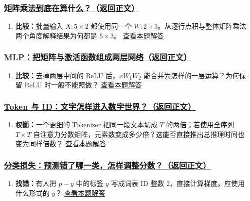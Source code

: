 \subsubsection*{\hyperref[check:03-matrix-multiplication]{矩阵乘法到底在算什么？（返回正文）}}\begin{enumerate}[label={},leftmargin=4.8em,itemsep=4pt]
\item[\textbf{C4-12.}] \label{exercise:C4-12}\label{extension:03-matrix-multiplication:4}\textbf{比较：}批量输入 $X:5\times2$ 都使用同一个 $W:2\times3$。从逐行点积与整体矩阵乘法两个角度解释结果为何都是 $5\times3$。 \hyperref[answerpiece:03-matrix-multiplication:4]{查看本题解答}
\end{enumerate}

\subsubsection*{\hyperref[check:10-mlp]{MLP：把矩阵与激活函数组成两层网络（返回正文）}}\begin{enumerate}[label={},leftmargin=4.8em,itemsep=4pt]
\item[\textbf{C4-13.}] \label{exercise:C4-13}\label{extension:10-mlp:4}\textbf{比较：}去掉两层中间的 ReLU 后，$xW_1W_2$ 能合并为怎样的一层运算？为何保留 ReLU 时一般不能照做？ \hyperref[answerpiece:10-mlp:4]{查看本题解答}
\end{enumerate}

\subsubsection*{\hyperref[check:20a-tokenizer]{Token 与 ID：文字怎样进入数字世界？（返回正文）}}\begin{enumerate}[label={},leftmargin=4.8em,itemsep=4pt]
\item[\textbf{C4-14.}] \label{exercise:C4-14}\label{extension:20a-tokenizer:4}\textbf{权衡：}一个更细的 Tokenizer 把同一段文本切成 $T$ 的两倍；若使用全序列 $T\times T$ 自注意力分数矩阵，元素数变成多少倍？这能否直接推出总推理时间也变为同样倍数？ \hyperref[answerpiece:20a-tokenizer:4]{查看本题解答}
\end{enumerate}

\subsubsection*{\hyperref[check:20c-classification-loss]{分类损失：预测错了哪一类，怎样调整分数？（返回正文）}}\begin{enumerate}[label={},leftmargin=4.8em,itemsep=4pt]
\item[\textbf{C4-15.}] \label{exercise:C4-15}\label{extension:20c-classification-loss:4}\textbf{找错：}有人把 $p-y$ 中的标签 $y$ 写成词表 ID 整数 $2$，直接计算梯度。应使用什么形式的 $y$？ \hyperref[answerpiece:20c-classification-loss:4]{查看本题解答}
\end{enumerate}

